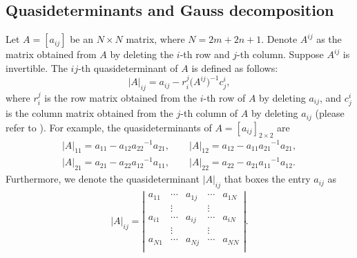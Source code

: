 \documentclass[pdftex]{sigma}
\numberwithin{equation}{section}
\begin{document}
\subsection{Quasideterminants and Gauss decomposition }\label{sec4.3}
Let $A=[a_{ij}]$ be an $N\times N$ matrix, where $N=2m+2n+1$. Denote $A^{ij}$ as the matrix obtained from $A$ by deleting the $i$-th row and $j$-th column. Suppose $A^{ij}$ is invertible. The $ij$-th quasideterminant of $A$ is defined as follows:
\begin{equation*}
 |A|_{ij}=a_{ij}-r^j_i\bigl(A^{ij}\bigr)^{-1}c^i_j,
\end{equation*}
where $r^j_i$ is the row matrix obtained from the $i$-th row of $A$ by deleting $a_{ij}$, and $c^i_j$ is the column matrix obtained from the $j$-th column of $A$ by deleting $a_{ij}$ (please refer to \cite{IMG,DKBM}). For example, the quasideterminants of $A=[a_{ij}]_{2\times2}$ are
\begin{gather*}
 |A|_{11}= a_{11}-a_{12}{a_{22}}^{-1}a_{21}, \qquad |A|_{12}= a_{12}-a_{11}{a_{21}}^{-1}a_{21},\\
 |A|_{21}= a_{21}-a_{22}{a_{12}}^{-1}a_{11}, \qquad |A|_{22}= a_{22}-a_{21}{a_{11}}^{-1}a_{12}.
\end{gather*}
Furthermore, we denote the quasideterminant $|A|_{ij}$ that boxes the entry $a_{ij}$ as
\begin{align*}
|A|_{ij}=
\left|
 \begin{matrix}
 a_{11} & \cdots & a_{1j} & \cdots & a_{1N} \\
 & \vdots & & \vdots & \\
 a_{i1} & \cdots & \boxed{a_{ij}} & \cdots & a_{iN} \\
 & \vdots & & \vdots & \\
 a_{N1} & \cdots & a_{Nj} & \cdots & a_{NN} \\
 \end{matrix}
\right|.
\end{align*}
\end{document}
